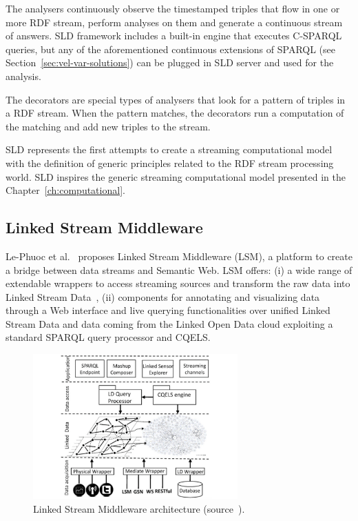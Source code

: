 The \textsf{analysers} continuously observe the timestamped triples that flow in one or more RDF stream, perform analyses on them and generate a continuous stream of answers. SLD framework includes a built-in engine that executes C-SPARQL queries, but any of the aforementioned continuous extensions of SPARQL (see Section~\ref{sec:vel-var-solutions}) can be plugged in SLD server and used for the analysis. 

The \textsf{decorators} are special types of analysers that look for a pattern of triples in a RDF stream. When the pattern matches, the decorators run a computation of the matching and add new triples to the stream.

SLD represents the first attempts to create a streaming computational model with the definition of generic principles related to the RDF stream processing world. SLD inspires the generic streaming computational model presented in the Chapter~\ref{ch:computational}.

\subsection{Linked Stream Middleware}
Le-Phuoc et al.~\cite{DBLP:journals/ws/PhuocNPH12} proposes Linked Stream Middleware (LSM), a platform to create a bridge between data streams and Semantic Web.
LSM offers: (i) a wide range of extendable wrappers to access streaming sources and transform the raw data into Linked Stream Data~\cite{DBLP:conf/semweb/SequedaC09}, (ii) components for annotating and visualizing data through a Web interface and live querying functionalities over unified Linked Stream Data and data coming from the Linked Open Data cloud exploiting a standard SPARQL query processor and CQELS.

\begin{figure}[t]
\begin{center}
\includegraphics[width=0.7\textwidth]{img/lsm}
\caption{Linked Stream Middleware architecture (source~\cite{DBLP:journals/ws/PhuocNPH12}).}
\label{fig:lsm-arch}
\end{center}
\end{figure}

